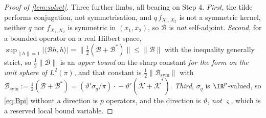 \begin{proof}[Proof of \cref{lem:solset}]
Three further limbs, all bearing on Step 4. \emph{First}, the tilde performs
conjugation, not symmetrisation, and $q\,f_{X_1,X_2}$ is not a symmetric kernel, neither $q$ nor
$f_{X_1,X_2}$ is symmetric in $(x_1,x_2)$, so $\mathcal B$ is \emph{not} self-adjoint. \emph{Second},
for a bounded operator on a real Hilbert space,
$\sup_{\|h\|=1}|\langle\mathcal Bh,h\rangle|=\|\tfrac12(\mathcal B+\mathcal B^\ast)\|\le\|\mathcal B\|$
with the inequality generally strict, so $\tfrac12\|\mathcal B\|$ is an \emph{upper bound} on the sharp
constant \emph{for the form on the unit sphere of $L^{2}(\pi)$}, and that constant is
$\tfrac12\|\mathcal B_{\mathrm{sym}}\|$ with
$\mathcal B_{\mathrm{sym}}:=\tfrac12(\mathcal B+\mathcal B^\ast)=(\vartheta'\sigma_q/\pi)\cdot{}-\vartheta'(\tilde{\mathcal K}+\tilde{\mathcal K}^\ast)$.
\emph{Third}, $\sigma_q$ is $\IR^{p}$-valued, so \eqref{eq:Bpi} without a direction is $p$
operators, and the direction is $\vartheta$, \emph{not $\varsigma$}, which is a reserved local bound
variable.


\end{proof}
